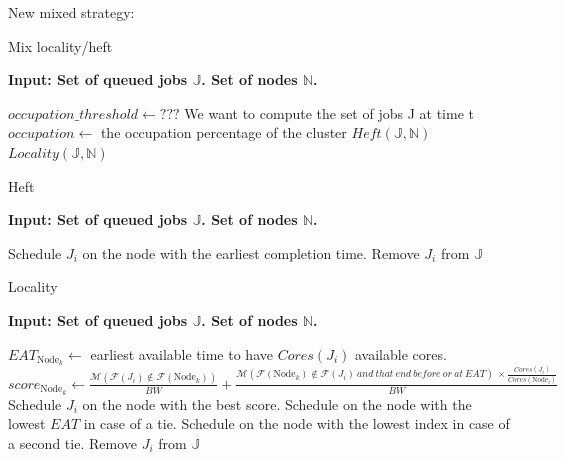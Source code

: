 \documentclass[a4paper]{article}
\newcommand{\Node}[1]{\ensuremath{\mathrm{Node}_{#1}}\xspace}
\newcommand{\inputs}{\ensuremath{\mathcal{F}}\xspace}
\newcommand{\memory}{\ensuremath{\mathcal{M}}\xspace}
\newcommand{\bandwidth}{\mathit{BW}\xspace}
\newcommand{\core}{\mathit{Cores}\xspace}
\newcommand{\jobset}{\ensuremath{\mathbb{J}}\xspace}
\newcommand{\nodeset}{\ensuremath{\mathbb{N}}\xspace}
\begin{document}
New mixed strategy:
\begin{algorithm}[htbp]
\caption{Mix locality/heft}
\hspace*{\algorithmicindent} \textbf{Input: Set of queued jobs $\jobset$. Set of nodes $\nodeset$.} \\
\begin{algorithmic}[0]
\State $occupation\_threshold \gets ???$
\State We want to compute the set of jobs J at time t
\State $occupation \gets$ the occupation percentage of the cluster 
	\State $Heft(\jobset,\nodeset)$
\Else
	\State $Locality(\jobset,\nodeset)$
\EndIf
\end{algorithmic}
\end{algorithm}

\begin{algorithm}[htbp]
\caption{Heft}
\hspace*{\algorithmicindent} \textbf{Input: Set of queued jobs $\jobset$. Set of nodes $\nodeset$.} \\
\begin{algorithmic}[0]
\ForEach {$J_i \in \jobset$}
	\State Schedule $J_i$ on the node with the earliest completion time. 
	\State Remove $J_i$ from $\jobset$
\EndFor
\end{algorithmic}
\end{algorithm}

\begin{algorithm}[htbp]
\caption{Locality}
\hspace*{\algorithmicindent} \textbf{Input: Set of queued jobs $\jobset$. Set of nodes $\nodeset$.} \\
\begin{algorithmic}[0]
\ForEach {$J_i \in \jobset$}
	\ForEach {$\Node{k} \in \nodeset$}
		\State $EAT_{\Node{k}} \gets$ earliest available time to have $\core(J_i)$ available cores.
		\State $score_{\Node{k}} \gets \frac{\memory(\inputs(J_i) \notin \inputs(\Node{k}))}{\bandwidth} + \frac{\memory(\inputs(\Node{k}) \notin \inputs(J_i)~and~that~end~before~or~at~EAT)~ \times \frac{\core(J_i)}{\core(\Node{i})}}{\bandwidth}$
	\EndFor
	\State Schedule $J_i$ on the node with the best score. Schedule on the node with the lowest $EAT$ in case of a tie. Schedule on the node with the lowest index in case of a second tie. 
	\State Remove $J_i$ from $\jobset$
\EndFor
\end{algorithmic}
\end{algorithm}
\end{document}
